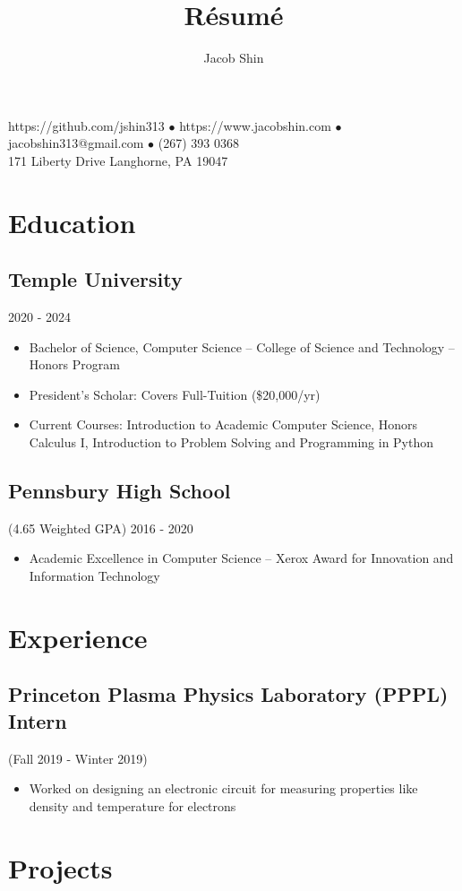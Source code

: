 \documentclass{article}
\makeatletter
\renewcommand{\maketitle}{
    \begin{center}
        {\huge\bfseries
        \theauthor}
    \end{center}
    \begin{center}
        \vspace{1em}
        \leavevmode
        https://github.com/jshin313 $\bullet$ https://www.jacobshin.com $\bullet$ jacobshin313@gmail.com $\bullet$ (267) 393 0368
        \vspace{1em}
        \\
        171 Liberty Drive Langhorne, PA 19047
    \end{center}
}
\makeatother
\begin{document}
\title{R\'esum\'e}
\author{Jacob Shin}

\maketitle
\section{Education}
\subsection{Temple University}\hspace{31em} 2020 - 2024
\begin{itemize}
    \item Bachelor of Science, Computer Science -- College of Science and Technology -- Honors Program
    \item President's Scholar: Covers Full-Tuition (\$20,000/yr)
    \item Current Courses: Introduction to Academic Computer Science, Honors Calculus I, Introduction to Problem Solving and Programming in Python
\end{itemize}

\subsection{Pennsbury High School}(4.65 Weighted GPA)\hspace{19em} 2016 - 2020
\begin{itemize}
    \item Academic Excellence in Computer Science -- Xerox Award for Innovation and Information Technology
\end{itemize}

\section{Experience}
\subsection{Princeton Plasma Physics Laboratory (PPPL) Intern} (Fall 2019 - Winter 2019)
\begin{itemize}
    \item Worked on designing an electronic circuit for measuring properties like density and temperature for electrons
\end{itemize}

\section{Projects}
\end{document}

